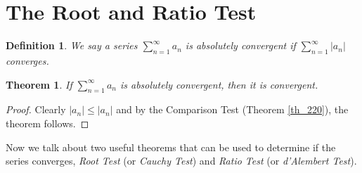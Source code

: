 \documentclass[10pt]{book}
\newtheorem{definition}{Definition}[chapter]
\newtheorem{theorem}{Theorem}[chapter]
\theoremstyle{definition}
\numberwithin{equation}{chapter}
\begin{document}
\medskip



\section{The Root and Ratio Test}

\begin{definition}
We say a series $\sum^\infty_{n=1} a_n$ is absolutely convergent if $\sum^\infty_{n=1} \left|a_n\right|$ converges.
\end{definition}

\medskip

\begin{theorem}
If $\sum^\infty_{n=1} a_n$ is absolutely convergent, then it is convergent.
\end{theorem}
\begin{proof}
Clearly $\left|a_n\right| \leq \left|a_n\right|$ and by the Comparison Test (Theorem \ref{th_220}), the theorem follows.
\end{proof}

\medskip

Now we talk about two useful theorems that can be used to determine if the series converges, {\em Root Test} (or {\em Cauchy Test}) and {\em Ratio Test} (or {\em d'Alembert Test}).

\medskip
\end{document}
